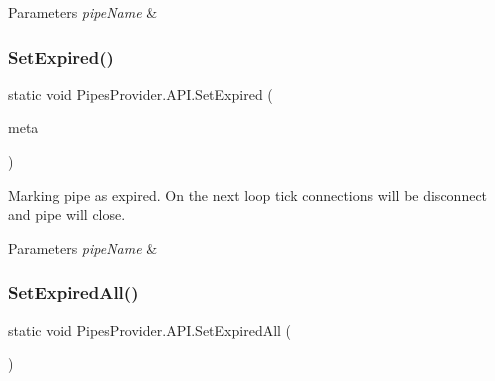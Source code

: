 \begin{DoxyParams}{Parameters}
{\em pipe\+Name} & \\
\hline
\end{DoxyParams}
\mbox{\label{class_pipes_provider_1_1_a_p_i_a9bfed3a9b5733c6a76235ec096c903e3}} 
\subsubsection{\texorpdfstring{Set\+Expired()}{SetExpired()}\hspace{0.1cm}{\footnotesize\ttfamily [2/2]}}
{\footnotesize\ttfamily static void Pipes\+Provider.\+A\+P\+I.\+Set\+Expired (\begin{DoxyParamCaption}\item[{\mbox{\hyperlink{class_pipes_provider_1_1_server_transmission_meta}{Server\+Transmission\+Meta}}}]{meta }\end{DoxyParamCaption})\hspace{0.3cm}{\ttfamily [static]}}



Marking pipe as expired. On the next loop tick connections will be disconnect and pipe will close. 


\begin{DoxyParams}{Parameters}
{\em pipe\+Name} & \\
\hline
\end{DoxyParams}
\mbox{\label{class_pipes_provider_1_1_a_p_i_a7e26cdf7c5b1f43abd155b4988f7bab1}} 
\subsubsection{\texorpdfstring{Set\+Expired\+All()}{SetExpiredAll()}}
{\footnotesize\ttfamily static void Pipes\+Provider.\+A\+P\+I.\+Set\+Expired\+All (\begin{DoxyParamCaption}{ }\end{DoxyParamCaption})\hspace{0.3cm}{\ttfamily [static]}}



